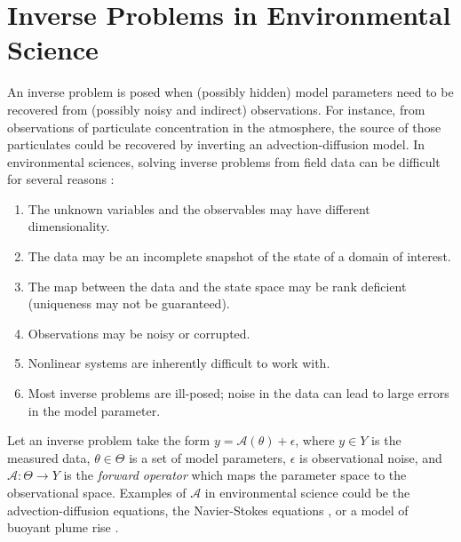 \section{Inverse Problems in Environmental Science}
\label{sec:measure_and_model}
An inverse problem is posed when (possibly hidden) model parameters need to be recovered from (possibly noisy and indirect) observations.
For instance, from observations of particulate concentration in the atmosphere, the source of those particulates could be recovered by inverting an advection-diffusion model.
In environmental sciences, solving inverse problems from field data can be difficult for several reasons \autocite{arridge2019solving}: 

\begin{enumerate}
	\item The unknown variables and the observables may have different dimensionality.
	\item The data may be an incomplete snapshot of the state of a domain of interest.
	\item The map between the data and the state space may be rank deficient (uniqueness may not be guaranteed).
	\item Observations may be noisy or corrupted.
	\item Nonlinear systems are inherently difficult to work with.
	\item Most inverse problems are ill-posed; noise in the data can lead to large errors in the model parameter.
\end{enumerate}

Let an inverse problem take the form $y = \mathcal{A}(\theta) + \epsilon$, where $y \in Y$ is the measured data, $\theta \in \Theta$ is a set of model parameters, $\epsilon$ is observational noise, and $\mathcal{A} : \Theta \longrightarrow Y$ is the \emph{forward operator} which maps the parameter space to the observational space. Examples of $\mathcal{A}$ in environmental science could be the advection-diffusion equations, the Navier-Stokes equations \autocite{euler1757principes,182navier2lois,stokes1851effect}, or a model of buoyant plume rise \autocite{speer1989model,lavelle2013turbulent}.

